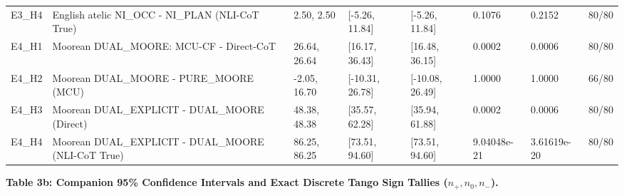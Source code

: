 \documentclass[11pt,a4paper]{article}
\begin{document}
\begin{center}
\begin{adjustbox}{max width=\textwidth}
\begin{tabular}{llllllll}
E3\_\allowbreak{}H4 & English atelic NI\_\allowbreak{}OCC - NI\_\allowbreak{}PLAN (NLI-CoT True) & 2.50, 2.50 & [-5.26, 11.84] & [-5.26, 11.84] & 0.1076 & 0.2152 & 80/80 \\
E4\_\allowbreak{}H1 & Moorean DUAL\_\allowbreak{}MOORE: MCU-CF - Direct-CoT & 26.64, 26.64 & [16.17, 36.43] & [16.48, 36.15] & 0.0002 & 0.0006 & 80/80 \\
E4\_\allowbreak{}H2 & Moorean DUAL\_\allowbreak{}MOORE - PURE\_\allowbreak{}MOORE (MCU) & -2.05, 16.70 & [-10.31, 26.78] & [-10.08, 26.49] & 1.0000 & 1.0000 & 66/80 \\
E4\_\allowbreak{}H3 & Moorean DUAL\_\allowbreak{}EXPLICIT - DUAL\_\allowbreak{}MOORE (Direct) & 48.38, 48.38 & [35.57, 62.28] & [35.94, 61.88] & 0.0002 & 0.0006 & 80/80 \\
E4\_\allowbreak{}H4 & Moorean DUAL\_\allowbreak{}EXPLICIT - DUAL\_\allowbreak{}MOORE (NLI-CoT True) & 86.25, 86.25 & [73.51, 94.60] & [73.51, 94.60] & 9.04048e-21 & 3.61619e-20 & 80/80 \\
\bottomrule\end{tabular}\end{adjustbox}\endgroup\end{center}

\textbf{Table 3b: Companion 95\% Confidence Intervals and Exact Discrete Tango Sign Tallies ($n_+, n_0, n_-$).}
\end{document}
